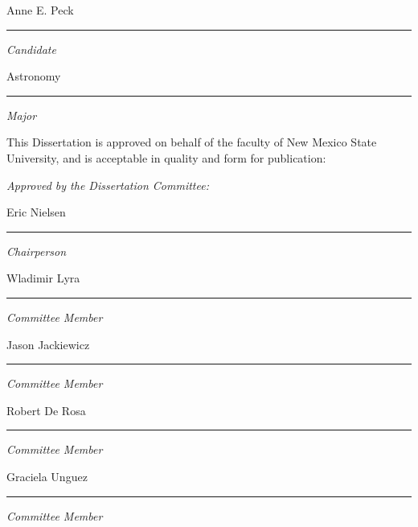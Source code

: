 \begin{flushleft}
{\normalsize Anne E. Peck}
\vspace{3pt}
\hrule
\emph{\large Candidate}


{\normalsize Astronomy}
\vspace{3pt}
\hrule
\emph{\large Major}

\bigskip
\begin{singlespace}
{\normalsize This Dissertation is approved on behalf of the faculty of New Mexico State University, and is acceptable in quality and form for publication:}
\end{singlespace}

\emph{\large Approved by the Dissertation Committee:}

{\normalsize Eric Nielsen}
\vspace{3pt}
\hrule
\emph{ \large Chairperson}

\vspace{0.2in}

\normalsize{Wladimir Lyra}
\vspace{3pt}
\hrule
\emph{ \large Committee Member}

\vspace{0.2in}

\normalsize{Jason Jackiewicz}
\vspace{3pt}
\hrule
\emph{\large Committee Member}

\vspace{0.2in}

\normalsize{Robert De Rosa}
\vspace{3pt}
\hrule
\emph{ \large Committee Member}

\vspace{0.2in}

\normalsize{Graciela Unguez}
\vspace{3pt}
\hrule
\emph{ \large Committee Member}
\vspace{0.2in}


\end{flushleft}

